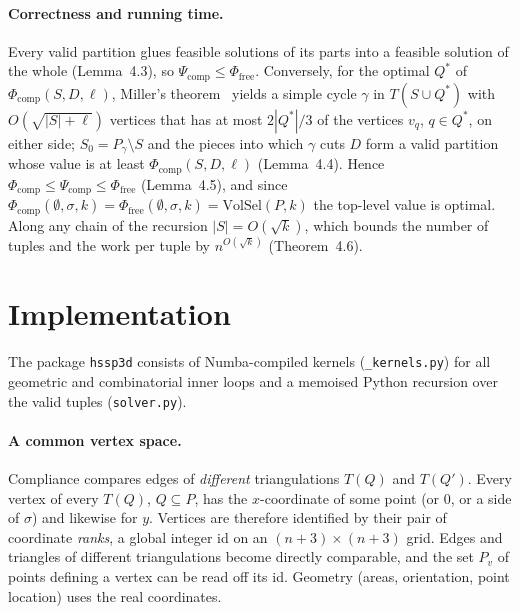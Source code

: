 \documentclass[12pt,a4paper]{article}
\newcommand{\Pfree}{\Phi_{\mathrm{free}}}
\newcommand{\Pcomp}{\Phi_{\mathrm{comp}}}
\newcommand{\Psic}{\Psi_{\mathrm{comp}}}
\newcommand{\code}[1]{\texttt{#1}}
\begin{document}
\paragraph{Correctness and running time.}
Every valid partition glues feasible solutions of its parts into a feasible solution of the
whole (Lemma~4.3), so $\Psic\le\Pfree$.  Conversely, for the optimal $Q^*$ of
$\Pcomp(S,D,\ell)$, Miller's theorem~\cite{Miller} yields a simple cycle $\gamma$ in
$T(S\cup Q^*)$ with $O(\sqrt{|S|+\ell})$ vertices that has at most $2|Q^*|/3$ of the
vertices $v_q$, $q\in Q^*$, on either side; $S_0=P_\gamma\setminus S$ and the pieces into
which $\gamma$ cuts $D$ form a valid partition whose value is at least
$\Pcomp(S,D,\ell)$ (Lemma~4.4).  Hence
$\Pcomp\le\Psic\le\Pfree$ (Lemma~4.5), and since
$\Pcomp(\emptyset,\sigma,k)=\Pfree(\emptyset,\sigma,k)=\mathrm{VolSel}(P,k)$ the top-level
value is optimal.  Along any chain of the recursion $|S|=O(\sqrt{k})$, which bounds the
number of tuples and the work per tuple by $n^{O(\sqrt{k})}$ (Theorem~4.6).

\section{Implementation}
The package \code{hssp3d} consists of Numba-compiled kernels (\code{\_kernels.py}) for all
geometric and combinatorial inner loops and a memoised Python recursion over the valid tuples
(\code{solver.py}).

\paragraph{A common vertex space.}
Compliance compares edges of \emph{different} triangulations $T(Q)$ and $T(Q')$.  Every vertex
of every $T(Q)$, $Q\subseteq P$, has the $x$-coordinate of some point (or $0$, or a side of
$\sigma$) and likewise for $y$.  Vertices are therefore identified by their pair of coordinate
\emph{ranks}, a global integer id on an $(n+3)\times(n+3)$ grid.  Edges and triangles of different
triangulations become directly comparable, and the set $P_v$ of points defining a vertex can be
read off its id.  Geometry (areas, orientation, point location) uses the real coordinates.
\end{document}
